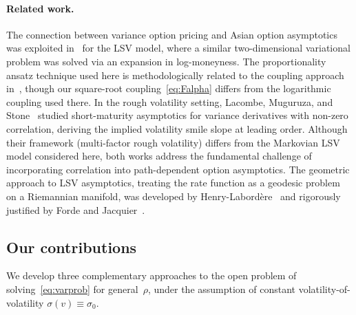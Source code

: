 \documentclass[12pt]{article}
\begin{document}
\paragraph{Related work.}
The connection between variance option pricing and Asian option asymptotics was
exploited in~\cite{PZ2024} for the LSV model, where a similar two-dimensional
variational problem was solved via an expansion in log-moneyness. The proportionality
ansatz technique used here is methodologically related to the coupling approach
in~\cite{PZ2024}, though our square-root coupling~\eqref{eq:Falpha} differs from the
logarithmic coupling used there. In the rough volatility setting, Lacombe, Muguruza,
and Stone~\cite{LMS2021} studied short-maturity asymptotics for variance derivatives
with non-zero correlation, deriving the implied volatility smile slope at leading order.
Although their framework (multi-factor rough volatility) differs from the Markovian LSV
model considered here, both works address the fundamental challenge of incorporating
correlation into path-dependent option asymptotics. The geometric approach to LSV
asymptotics, treating the rate function as a geodesic problem on a Riemannian manifold,
was developed by Henry-Labord\`ere~\cite{HenryLabordere} and rigorously justified by
Forde and Jacquier~\cite{FordeJacquier}.

\subsection{Our contributions}

We develop three complementary approaches to the open problem of solving~\eqref{eq:varprob}
for general~$\rho$, under the assumption of constant volatility-of-volatility
$\sigma(v)\equiv\sigma_0$.
\end{document}
